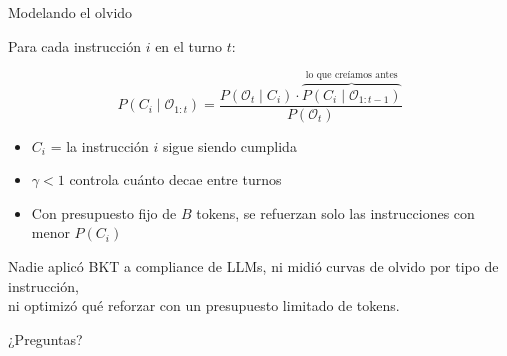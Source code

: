 \documentclass[aspectratio=169, 12pt]{beamer}
\begin{document}
\begin{frame}{Modelando el olvido}

Para cada instrucci\'on $i$ en el turno $t$:

\[
P(C_i \mid \mathcal{O}_{1:t}) =
    \frac{P(\mathcal{O}_t \mid C_i) \cdot \overbrace{P(C_i \mid \mathcal{O}_{1:t-1})}^{\text{lo que cre\'iamos antes}}}
         {P(\mathcal{O}_t)}
\]

\begin{itemize}
    \item $C_i$ = la instrucci\'on $i$ sigue siendo cumplida
    \item $\gamma < 1$ controla cu\'anto decae entre turnos
    \item Con presupuesto fijo de $B$ tokens, se refuerzan solo las instrucciones con menor $P(C_i)$
\end{itemize}

\vspace{0.5em}

\begin{center}
\footnotesize
Nadie aplic\'o BKT a compliance de LLMs, ni midi\'o curvas de olvido por tipo de instrucci\'on,\\
ni optimiz\'o qu\'e reforzar con un presupuesto limitado de tokens.
\end{center}

\end{frame}

\begin{frame}[standout]

\Large
¿Preguntas?

\end{frame}

\appendix
\end{document}
